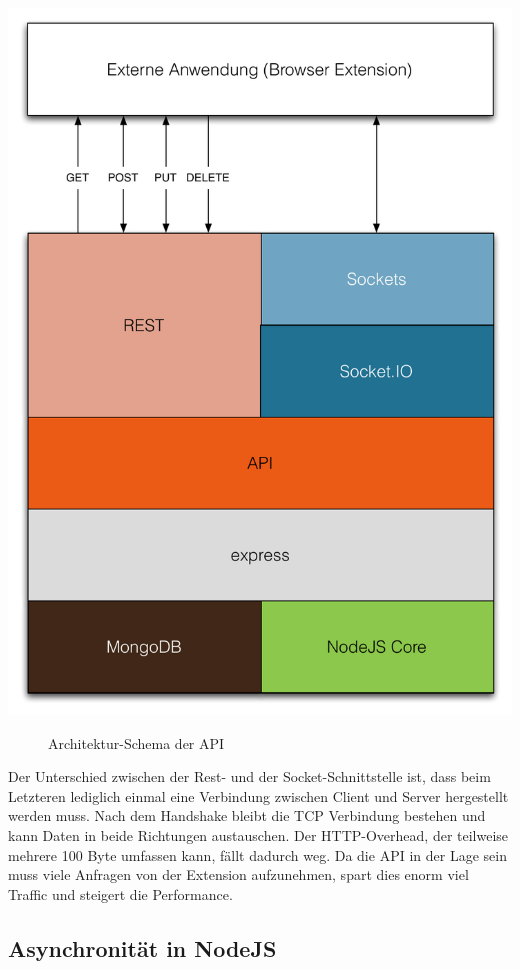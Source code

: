 \begin{center}
\includegraphics[scale=0.49]{./images/api-architecture}
\end{center}
\begin{figure}[htb]
   \centering
   \caption{Architektur-Schema der API}
    \label{api}
\end{figure}

Der Unterschied zwischen der Rest- und der Socket-Schnittstelle ist, dass beim Letzteren lediglich einmal eine Verbindung zwischen Client und Server hergestellt werden muss. Nach dem Handshake bleibt die TCP Verbindung bestehen und kann Daten in beide Richtungen austauschen. Der HTTP-Overhead, der teilweise mehrere 100 Byte umfassen kann, fällt dadurch weg. Da die API in der Lage sein muss viele Anfragen von der Extension aufzunehmen, spart dies enorm viel Traffic und steigert die Performance.


\subsection{Asynchronität in NodeJS}

